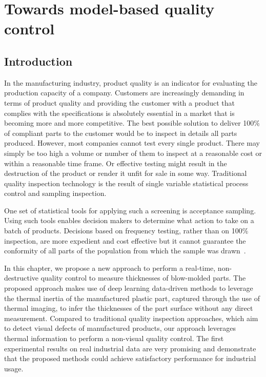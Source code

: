 \chapter{Towards model-based quality control}
\minitoc



\section{Introduction}


In the manufacturing industry, product quality is an indicator for evaluating the production capacity of a company. Customers are increasingly demanding in terms of product quality and providing the customer with a product that complies with the specifications is absolutely essential in a market that is becoming more and more competitive. The best possible solution to deliver 100\% of compliant parts to the customer would be to inspect in details all parts produced. However, most companies cannot test every single product. There may simply be too high a volume or number of them to inspect at a reasonable cost or within a reasonable time frame. Or effective testing might result in the destruction of the product or render it unfit for sale in some way. Traditional quality inspection technology is the result of single variable statistical process control and sampling inspection.

One set of statistical tools for applying such a screening is acceptance sampling. Using such tools enables decision makers to determine what action to take on a batch of products. Decisions based on frequency testing, rather than on 100\% inspection, are more expedient and cost effective but it cannot guarantee the conformity of all parts of the population from which the sample was drawn~\citep{fuchs1998multivariate}.

In this chapter, we propose a new approach to perform a real-time, non-destructive quality control to measure thicknesses of blow-molded parts. The proposed approach makes use of deep learning data-driven methods to leverage the thermal inertia of the manufactured plastic part, captured through the use of thermal imaging, to infer the thicknesses of the part surface without any direct measurement. Compared to traditional quality inspection approaches, which aim to detect visual defects of manufactured products, our approach leverages thermal information to perform a non-visual quality control. 
%
The first experimental results on real industrial data are very promising and demonstrate that the proposed methods could achieve satisfactory performance for industrial usage.

